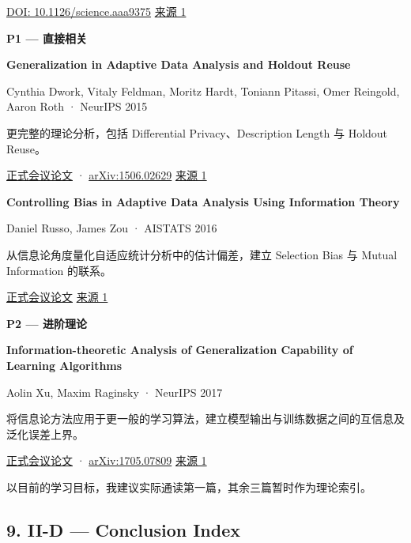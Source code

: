 \href{https://doi.org/10.1126/science.aaa9375}{DOI: 10.1126/science.aaa9375} \href{https://pubmed.ncbi.nlm.nih.gov/26250683/}{来源 1}

\textbf{P1 --- 直接相关}

\textbf{Generalization in Adaptive Data Analysis and Holdout Reuse}

Cynthia Dwork, Vitaly Feldman, Moritz Hardt, Toniann Pitassi, Omer Reingold, Aaron Roth · NeurIPS 2015

更完整的理论分析，包括 Differential Privacy、Description Length 与 Holdout Reuse。

\href{https://papers.neurips.cc/paper_files/paper/2015/hash/bad5f33780c42f2588878a9d07405083-Abstract.html}{正式会议论文} · \href{https://arxiv.org/abs/1506.02629}{arXiv:1506.02629} \href{https://papers.neurips.cc/paper_files/paper/2015/hash/bad5f33780c42f2588878a9d07405083-Abstract.html}{来源 1}

\textbf{Controlling Bias in Adaptive Data Analysis Using Information Theory}

Daniel Russo, James Zou · AISTATS 2016

从信息论角度量化自适应统计分析中的估计偏差，建立 Selection Bias 与 Mutual Information 的联系。

\href{https://proceedings.mlr.press/v51/russo16.html}{正式会议论文} \href{https://proceedings.mlr.press/v51/russo16.html}{来源 1}

\textbf{P2 --- 进阶理论}

\textbf{Information-theoretic Analysis of Generalization Capability of Learning Algorithms}

Aolin Xu, Maxim Raginsky · NeurIPS 2017

将信息论方法应用于更一般的学习算法，建立模型输出与训练数据之间的互信息及泛化误差上界。

\href{https://papers.nips.cc/paper_files/paper/2017/hash/ad71c82b22f4f65b9398f76d8be4c615-Abstract.html}{正式会议论文} · \href{https://arxiv.org/abs/1705.07809}{arXiv:1705.07809} \href{https://papers.nips.cc/paper_files/paper/2017/hash/ad71c82b22f4f65b9398f76d8be4c615-Abstract.html}{来源 1}

以目前的学习目标，我建议实际通读第一篇，其余三篇暂时作为理论索引。

\hypertarget{part-2-20-0001-ii-d-conclusion-index}{%
\subsection{9. II-D --- Conclusion Index}\label{part-2-20-0001-ii-d-conclusion-index}}


